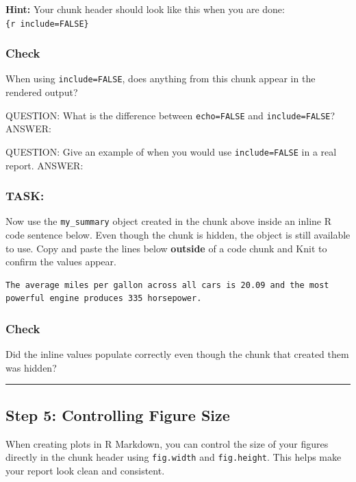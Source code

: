 \documentclass[
]{article}
\begin{document}
\textbf{Hint:} Your chunk header should look like this when you are
done:
\texttt{\textasciigrave{}\textasciigrave{}\textasciigrave{}\{r\ include=FALSE\}}

\subsubsection{Check}\label{check-3}

When using \texttt{include=FALSE}, does anything from this chunk appear
in the rendered output?

QUESTION: What is the difference between \texttt{echo=FALSE} and
\texttt{include=FALSE}? ANSWER:

QUESTION: Give an example of when you would use \texttt{include=FALSE}
in a real report. ANSWER:

\subsubsection{TASK:}\label{task-11}

Now use the \texttt{my\_summary} object created in the chunk above
inside an inline R code sentence below. Even though the chunk is hidden,
the object is still available to use. Copy and paste the lines below
\textbf{outside} of a code chunk and Knit to confirm the values appear.

\begin{verbatim}
The average miles per gallon across all cars is 20.09 and the most powerful engine produces 335 horsepower.
\end{verbatim}

\subsubsection{Check}\label{check-4}

Did the inline values populate correctly even though the chunk that
created them was hidden?

\begin{center}\rule{0.5\linewidth}{0.5pt}\end{center}

\subsection{Step 5: Controlling Figure
Size}\label{step-5-controlling-figure-size}

When creating plots in R Markdown, you can control the size of your
figures directly in the chunk header using \texttt{fig.width} and
\texttt{fig.height}. This helps make your report look clean and
consistent.
\end{document}
